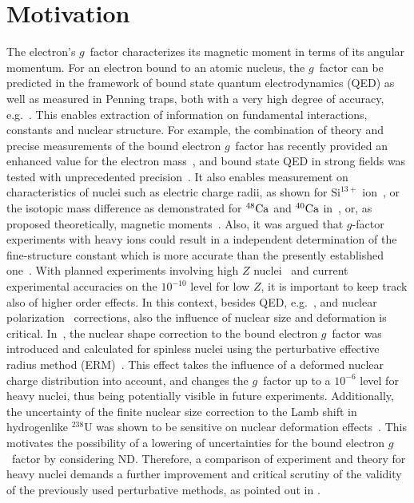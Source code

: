 \section{Motivation}
The electron's $g$~factor characterizes its magnetic moment in terms of its angular momentum. For an electron bound to an atomic nucleus, the $g$~factor can be predicted in the framework of bound state quantum electrodynamics (QED) as well as measured in Penning traps, both with a very high degree of accuracy, e.g.~\cite{Sturm2014,Sturm2011}. This enables extraction of information on fundamental interactions, constants and nuclear structure. For example, the combination of theory and precise measurements of the bound electron $g$~factor has recently provided an enhanced value for the electron mass~\cite{Sturm2014}, and bound state QED in strong fields was tested with unprecedented precision~\cite{Haffner2000, Verdu2004, Kohler2015, Zatorski2017}. It also enables measurement on characteristics of nuclei such as electric charge radii, as shown for $\textrm{Si}^{13+}$ ion~\cite{Sturm2011}, or the isotopic mass difference as demonstrated for $\null^{48} \textrm{Ca}$ and $\null^{40} \textrm{Ca}$ in~\cite{Kohler2016}, or, as proposed theoretically, magnetic moments~\cite{Yerokhin2011}.  Also, it was argued that $g$-factor experiments with heavy ions could result in a independent determination of the fine-structure constant which is more accurate than the presently established one~\cite{Shabaev2006}.
With planned experiments involving high $Z$ nuclei~\cite{HITRAP2008,vogel2015} and current experimental accuracies on the $10^{-10}$ level for low $Z$, it is important to keep track also of higher order effects. In this context, besides QED, e.g.~\cite{Yerokhin2004,yerokhin2017,Pachucki2005, czarnecki2016,czarnecki2018}, and nuclear polarization~\cite{Nefiodov} corrections, also the influence of nuclear size and deformation is critical.
In~\cite{jacek2012}, the nuclear shape correction to the bound electron $g$~factor was introduced and calculated for spinless nuclei using the perturbative effective radius method (ERM)~\cite{Shabaev1993,kozhedub2008}. This effect takes the influence of a deformed nuclear charge distribution into account, and changes the $g$~factor up to a $10^{-6}$ level for heavy nuclei, thus being potentially visible in future experiments.
Additionally, the uncertainty of the finite nuclear size correction to the Lamb shift in hydrogenlike $^{238}$U was shown to be sensitive on nuclear deformation effects~\cite{kozhedub2008}.
This motivates the possibility of a lowering of uncertainties for the bound electron $g$~factor by considering ND.
Therefore, a comparison of experiment and theory for heavy nuclei demands a further improvement and critical scrutiny of the validity of the previously used perturbative methods, as pointed out in \cite{karshenboim2018}.

